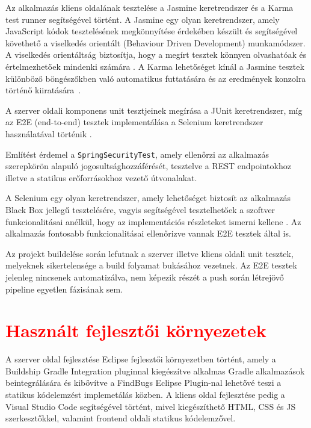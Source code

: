 Az alkalmazás kliens oldalának tesztelése a Jasmine keretrendszer és a Karma test runner segítségével történt. A Jasmine egy olyan keretrendszer, amely JavaScript kódok tesztelésének megkönnyítése érdekében készült és segítségével követhető a viselkedés orientált (Behaviour Driven Development) munkamódszer. A viselkedés orientáltság biztosítja, hogy a megírt tesztek könnyen olvashatóak és értelmezhetőek mindenki számára \cite{Jasmine}. A Karma lehetőséget kínál a Jasmine tesztek különböző böngészőkben való automatikus futtatására és az eredmények konzolra történő kiiratására~\cite{KarmaJasmine}.

A szerver oldali komponens unit tesztjeinek megírása a JUnit keretrendszer, míg az E2E (end-to-end) tesztek implementálása a Selenium keretrendszer használatával történik \cite{Selenium}.  

Említést érdemel a \texttt{SpringSecurityTest}, amely ellenőrzi az alkalmazás szerepkörön alapuló jogosultsághozzáférését, tesztelve a REST endpointokhoz illetve a statikus erőforrásokhoz vezető útvonalakat. 

A Selenium egy olyan keretrendszer, amely lehetőséget biztosít az alkalmazás Black Box jellegű tesztelésére, vagyis segítségével tesztelhetőek a szoftver funkcionalitásai anélkül, hogy az implementációs részleteket ismerni kellene \cite{Selenium}. Az alkalmazás fontosabb funkcionalitásai ellenőrizve vannak E2E tesztek által is.

Az projekt buildelése során lefutnak a szerver illetve kliens oldali unit tesztek, melyeknek sikertelensége a build folyamat bukásához vezetnek. Az E2E tesztek jelenleg nincsenek automatizálva, nem képezik részét a push során létrejövő pipeline egyetlen fázisának sem. 

\section{\textcolor{red}{Használt fejlesztői környezetek}}
\label{subsec:fejleszoiKornyezet}

A szerver oldal fejlesztése Eclipse \cite{Eclipse} fejlesztői környezetben történt, amely a Buildship Gradle Integration pluginnal \cite{GradlePlugin} kiegészítve alkalmas Gradle alkalmazások beintegrálására és kibővítve a FindBugs Eclipse Plugin-nal\cite{FindBugsEclipsePlugin} lehetővé teszi a statikus kódelemzést implemetálás közben. A kliens oldal fejlesztése pedig a Visual Studio Code \cite{VSCode} segítségével történt, mivel kiegészíthető HTML, CSS és JS szerkesztőkkel, valamint frontend oldali statikus kódelemzővel. 
